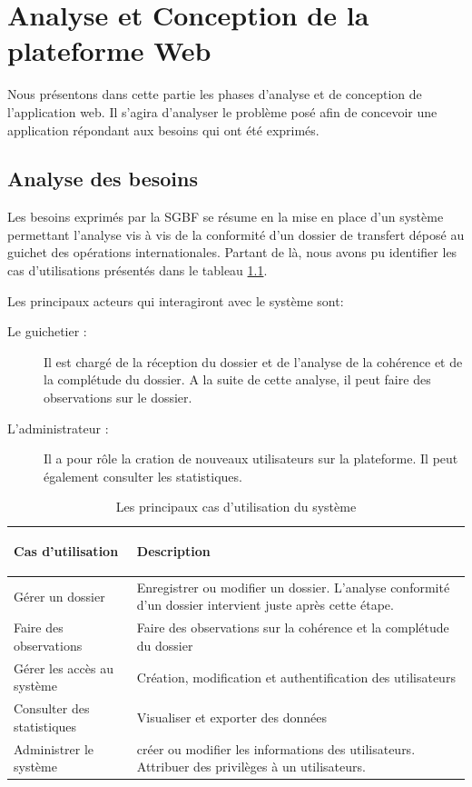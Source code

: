 \chapter{Analyse et Conception de la plateforme Web}
 Nous présentons dans cette partie les phases d'analyse et de conception de
 l'application web. Il s'agira d'analyser le problème posé afin de concevoir une
 application répondant aux besoins qui ont été exprimés.

 \section{Analyse des besoins}

 Les besoins exprimés par la SGBF se résume en la mise en place d'un système
 permettant l'analyse vis à vis de la conformité d'un dossier de
 transfert déposé au guichet des opérations internationales. Partant de là, nous
 avons pu identifier les cas d'utilisations présentés dans le tableau
 \ref{tab:usecase}.

 Les principaux acteurs qui interagiront avec le système sont:
 \begin{description}
   \item[Le guichetier :] Il est chargé de la réception du dossier et de
     l'analyse de la cohérence et de la complétude du dossier. A la suite de
     cette analyse, il peut faire des observations sur le dossier.
   \item[L'administrateur :] Il a pour rôle la cration de nouveaux utilisateurs
     sur la plateforme. Il peut également consulter les statistiques.
 \end{description}
  \begin{table}
  \begin{center}
    \begin{scriptsize}
      \renewcommand{\arraystretch}{2}
      \begin{tabular}{|m{4cm}|m{10cm}|}
        \hline
        \rowcolor[gray]{.7}
        \bf \rule[-0.4cm]{0mm}{1cm} Cas d'utilisation &  \bf Description\\
        \hline
        Gérer un dossier & Enregistrer ou modifier un dossier. L'analyse
        conformité d'un dossier intervient juste après cette étape. \\ 
        \hline
        Faire des observations & Faire des observations sur la cohérence et la
        complétude du dossier \\
        \hline
        Gérer les accès au système & Création, modification et authentification
        des utilisateurs \\
        \hline
        Consulter des statistiques & Visualiser et exporter des données \\
        \hline
        Administrer le système & créer ou modifier les informations des
        utilisateurs. Attribuer des privilèges à un utilisateurs.\\
        \hline
      \end{tabular}
    \end{scriptsize}
    \caption{Les principaux cas d'utilisation du système \label{tab:usecase}}
  \end{center}
\end{table}

